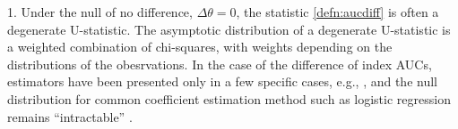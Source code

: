 \documentclass[12pt]{article}
\newcommand{\auc}{\theta}
\newcommand{\aucdiff}{\Delta\auc}
\theoremstyle{definition}
\newcommand{\comment}[1]{
  \iftoggle{commenttoggle}{
    {\normalsize{\color{red}{ #1}}\normalsize}
  }
  {}
}
\begin{document}
1. Under the null of no difference, $\aucdiff=0$, the statistic
\eqref{defn:aucdiff} is often a degenerate U-statistic. The asymptotic
distribution of a degenerate U-statistic is a weighted combination of
chi-squares, with weights depending on the distributions of the
obesrvations. In the case of the difference of index AUCs, estimators
have been presented only in a few specific cases, e.g., \citet{heller2017}, and the
null distribution for common coefficient estimation method such as
logistic regression remains ``intractable''
\citep{lee2021}.%

\end{document}
